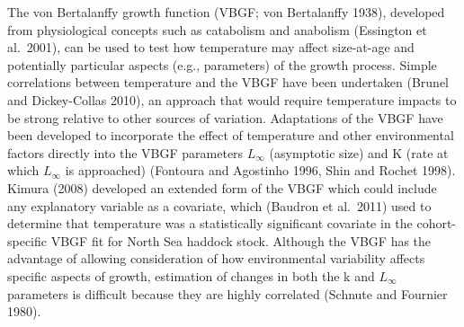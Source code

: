 \documentclass[]{article}
\begin{document}
The von Bertalanffy growth function (VBGF; von Bertalanffy 1938),
developed from physiological concepts such as catabolism and anabolism
(Essington et al.~2001), can be used to test how temperature may affect
size-at-age and potentially particular aspects (e.g., parameters) of the
growth process. Simple correlations between temperature and the VBGF
have been undertaken (Brunel and Dickey-Collas 2010), an approach that
would require temperature impacts to be strong relative to other sources
of variation. Adaptations of the VBGF have been developed to incorporate
the effect of temperature and other environmental factors directly into
the VBGF parameters \(L_\infty\) (asymptotic size) and K (rate at which
\(L_\infty\) is approached) (Fontoura and Agostinho 1996, Shin and
Rochet 1998). Kimura (2008) developed an extended form of the VBGF which
could include any explanatory variable as a covariate, which (Baudron et
al.~2011) used to determine that temperature was a statistically
significant covariate in the cohort-specific VBGF fit for North Sea
haddock stock. Although the VBGF has the advantage of allowing
consideration of how environmental variability affects specific aspects
of growth, estimation of changes in both the k and \(L_\infty\)
parameters is difficult because they are highly correlated (Schnute and
Fournier 1980).
\end{document}

